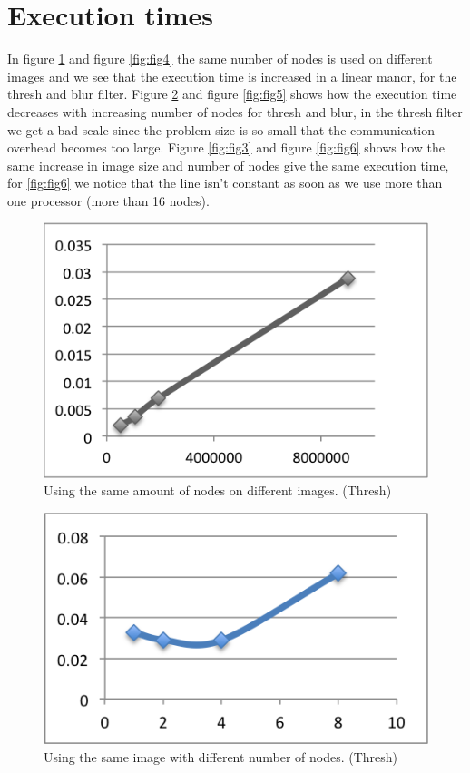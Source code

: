 \documentclass[a4paper]{article}
\begin{document}
\section{Execution times}

In figure \ref{fig:fig1} and figure \ref{fig:fig4} the same number of
nodes is used on different images and we see that the execution time is
increased in a linear manor, for the thresh and blur filter. Figure
\ref{fig:fig2} and figure \ref{fig:fig5} shows how the execution time
decreases with increasing number of nodes for thresh and blur, in the
thresh filter we get a bad scale since the problem size is so small that
the communication overhead becomes too large. Figure \ref{fig:fig3} and
figure \ref{fig:fig6} shows how the same increase in image size and
number of nodes give the same execution time, for \ref{fig:fig6} we
notice that the line isn\rq{}t constant as soon as we use more than one
processor (more than 16 nodes).

\begin{figure}[h]
  \centering
  \includegraphics{sameProcessors.png}
  \caption{Using the same amount of nodes on different images. (Thresh)}
  \label{fig:fig1}
\end{figure}

\begin{figure}[h]
  \centering
  \includegraphics{samePixels.png}
  \caption{Using the same image with different number of nodes. (Thresh)}
  \label{fig:fig2}
\end{figure}
\end{document}
